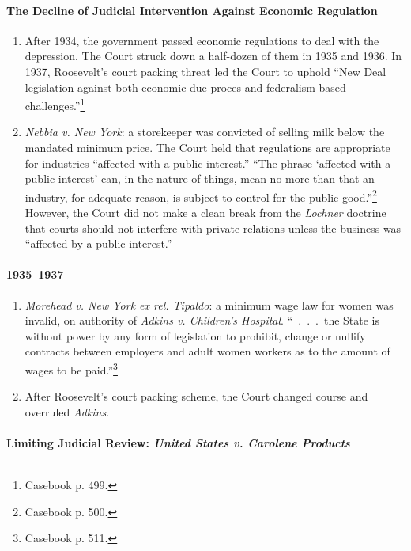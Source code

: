 \paragraph{The Decline of Judicial Intervention Against Economic 
Regulation}

\begin{enumerate}
    \item After 1934, the government passed economic regulations to deal with 
    the depression. The Court struck down a half-dozen of them in 1935 and 
    1936. In 1937, Roosevelt's court packing threat led the Court to uphold 
    ``New Deal legislation against both economic due proces and 
    federalism-based challenges.''\footnote{Casebook p. 499.}
    \item \emph{Nebbia v. New York}: a storekeeper was convicted of selling 
    milk below the mandated minimum price. The Court held that regulations are 
    appropriate for industries ``affected with a public interest.'' ``The 
    phrase `affected with a public interest' can, in the nature of things, 
    mean no more than that an industry, for adequate reason, is subject to 
    control for the public good.''\footnote{Casebook p. 500.} However, the 
    Court did not make a clean break from the \emph{Lochner} doctrine that 
    courts should not interfere with private relations unless the business was 
    ``affected by a public interest.''
\end{enumerate}

\paragraph{1935--1937}

\begin{enumerate}
    \item \emph{Morehead v. New York ex rel. Tipaldo}: a minimum wage law for 
    women was invalid, on authority of \emph{Adkins v. Children's Hospital}. 
    ``~.~.~.~the State is without power by any form of legislation to 
    prohibit, change or nullify contracts between employers and adult women 
    workers as to the amount of wages to be paid.''\footnote{Casebook p. 511.}
    \item After Roosevelt's court packing scheme, the Court changed course and 
    overruled \emph{Adkins}.
\end{enumerate}

\paragraph{Limiting Judicial Review: \emph{United States v. Carolene 
Products}}

